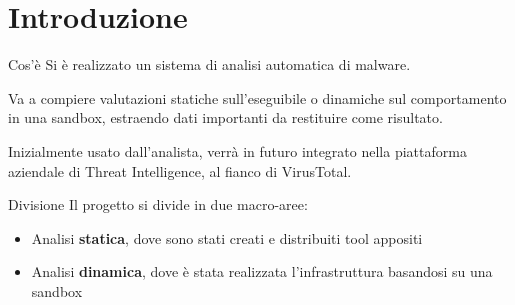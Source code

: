 \section{Introduzione}

\begin{frame}{Cos'è}
Si è realizzato un sistema di analisi automatica di malware.

Va a compiere valutazioni statiche sull'eseguibile o dinamiche sul comportamento in una sandbox, estraendo dati importanti da restituire come risultato.

Inizialmente usato dall'analista, verrà in futuro integrato nella piattaforma aziendale di Threat Intelligence, al fianco di VirusTotal.
\end{frame}

\begin{frame}{Divisione}
Il progetto si divide in due macro-aree:
\begin{itemize}
    \item Analisi \textbf{statica}, dove sono stati creati e distribuiti tool appositi
    \item Analisi \textbf{dinamica}, dove è stata realizzata l'infrastruttura basandosi su una sandbox
\end{itemize}
\end{frame}